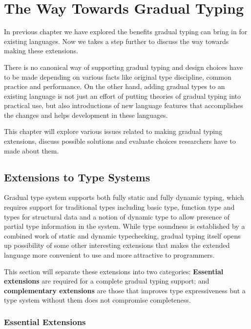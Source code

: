 
\section{The Way Towards Gradual Typing}


In previous chapter we have explored the benefits gradual typing
can bring in for existing languages.
Now we takes a step further to discuss the way towards making these extensions.

There is no canonical way of supporting gradual typing and design choices have to be made
depending on various facts like original type discipline, common practice and performance.
On the other hand, adding gradual types to an existing language
is not just an effort of putting theories of gradual typing into practical use,
but also introductions of new language features that accomplishes the changes
and helps development in these languages.

This chapter will explore various issues related to making gradual typing extensions,
discuss possible solutions and evaluate choices researchers have to made about them. 

\subsection{Extensions to Type Systems}

Gradual type system supports both fully static and fully dynamic typing,
which requires support for traditional types including
basic type, function type and types for structural data
and a notion of dynamic type to allow presence of partial type information in the system.
While type soundness is established by a combined work of static and dynamic typechecking,
gradual typing itself opens up possibility of some other interesting extensions
that makes the extended language more convenient to use and more attractive to programmers.

This section will separate these extensions into two categories:
\textbf{Essential extensions} are required for a complete gradual typing support;
and \textbf{complementary extensions} are those that improves type expressiveness
but a type system without them does not compromise completeness.

\subsubsection{Essential Extensions}

